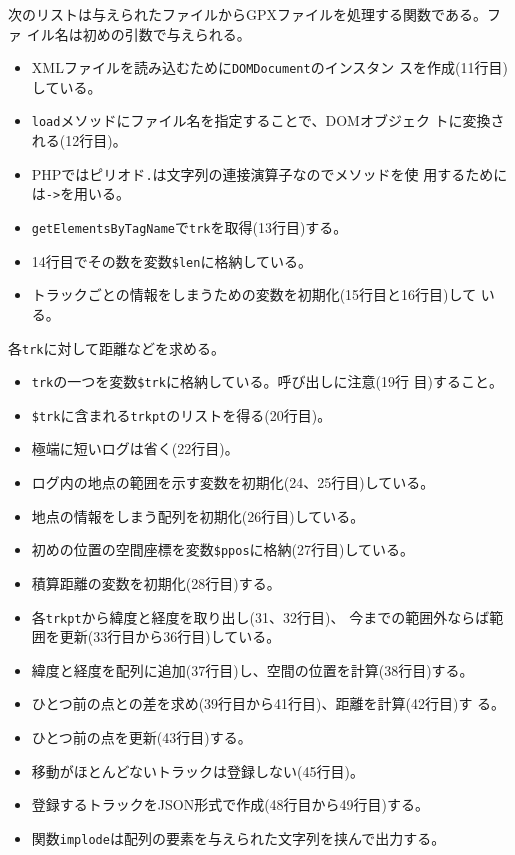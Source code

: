  次のリストは与えられたファイルからGPXファイルを処理する関数である。ファ
 イル名は初めの引数で与えられる。
 \begin{itemize}
  \item XMLファイルを読み込むために\texttt{DOMDocument}のインスタン
        スを作成(11行目)している。
  \item \texttt{load}メソッドにファイル名を指定することで、DOMオブジェク
        トに変換される(12行目)。
  \item PHPではピリオド\texttt{.}は文字列の連接演算子なのでメソッドを使
        用するためには\texttt{->}を用いる。
  \item \texttt{getElementsByTagName}で\texttt{trk}を取得(13行目)する。
  \item 14行目でその数を変数\texttt{\$len}に格納している。
  \item トラックごとの情報をしまうための変数を初期化(15行目と16行目)して
				いる。
 \end{itemize}
 各\texttt{trk}に対して距離などを求める。
 \begin{itemize}
  \item \texttt{trk}の一つを変数\texttt{\$trk}に格納している。呼び出しに注意(19行
        目)すること。
  \item \texttt{\$trk}に含まれる\texttt{trkpt}のリストを得る(20行目)。
  \item 極端に短いログは省く(22行目)。
  \item ログ内の地点の範囲を示す変数を初期化(24、25行目)している。
  \item 地点の情報をしまう配列を初期化(26行目)している。
  \item 初めの位置の空間座標を変数\texttt{\$ppos}に格納(27行目)している。
  \item 積算距離の変数を初期化(28行目)する。
 \end{itemize}
 \begin{itemize}
  \item 各\texttt{trkpt}から緯度と経度を取り出し(31、32行目)、
  今までの範囲外ならば範囲を更新(33行目から36行目)している。
  \item 緯度と経度を配列に追加(37行目)し、空間の位置を計算(38行目)する。
  \item ひとつ前の点との差を求め(39行目から41行目)、距離を計算(42行目)す
				る。
  \item ひとつ前の点を更新(43行目)する。
 \end{itemize}
 \begin{itemize}
  \item 移動がほとんどないトラックは登録しない(45行目)。
  \item 登録するトラックをJSON形式で作成(48行目から49行目)する。
  \item 関数\texttt{implode}は配列の要素を与えられた文字列を挟んで出力する。
  \end{itemize}
